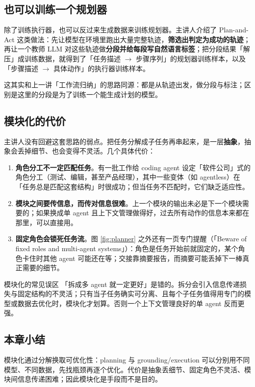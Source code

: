 \documentclass[a4paper]{article}
\begin{document}
\subsection{也可以训练一个规划器}

除了训练执行器，也可以反过来生成数据来训练规划器。主讲人介绍了 Plan-and-Act 这类做法：先让模型在环境里跑出大量完整轨迹，\textbf{筛选出判定为成功的轨迹}；再让一个教师 LLM 对这些轨迹做\textbf{分段并给每段写自然语言标签}；把分段结果「解压」成训练数据，就得到了「任务描述 $\rightarrow$ 步骤序列」的规划器训练样本，以及「步骤描述 $\rightarrow$ 具体动作」的执行器训练样本。

这其实和上一讲「工作流归纳」的思路同源：都是从轨迹出发，做分段与标注；区别是这里的分段是为了训练一个能生成计划的模型。

\subsection{模块化的代价}

主讲人没有回避这套思路的弱点。把任务分解成子任务再串起来，是一层\textbf{抽象}，抽象会丢掉细节、也会变得不灵活。几个具体代价：

\begin{enumerate}
\item \textbf{角色分工不一定匹配任务}。有一批工作给 coding agent 设定「软件公司」式的角色分工（测试、编辑，甚至产品经理），其中一些变体（如 agentless）在「任务总是匹配这套结构」时很成功；但当任务不匹配时，它们缺乏适应性。
\item \textbf{模块之间要传信息，而传对信息很难}。上一个模块的输出未必是下一个模块需要的；如果换成单 agent 且上下文管理做得好，过去所有动作的信息本来都在那里，可以直接用。
\item \textbf{固定角色会锁死任务流}。图 \ref{fig:planner} 之外还有一页专门提醒（「Beware of fixed roles and multi-agent systems」）：角色是任务开始前就固定的，某个角色卡住时其他 agent 可能还在等；交接靠摘要报告，而摘要可能丢掉下一棒真正需要的细节。
\end{enumerate}

\begin{warningbox}{模块化的常见误区}
「拆成多 agent 就一定更好」是错的。拆分会引入信息传递损失与固定结构的不灵活；只有当子任务确实可分离、且每个子任务值得用专门的模型或数据去优化时，模块化才划算。否则一个上下文管理良好的单 agent 反而更强。
\end{warningbox}

\subsection{本章小结}
模块化通过分解换取可优化性：planning 与 grounding/execution 可以分别用不同模型、不同数据，先找瓶颈再逐个优化。代价是抽象丢细节、固定角色不灵活、模块间信息传递困难；因此模块化是手段而不是目的。
\end{document}
